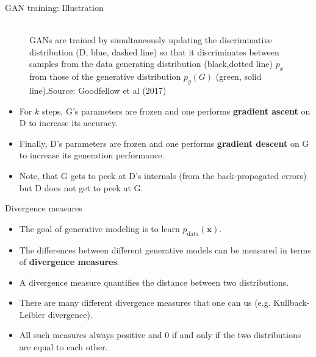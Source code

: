 \begin{frame} {GAN training: Illustration}
\begin{figure}
\centering
{}
\tiny{\\GANs are trained by simultaneously updating the discriminative distribution
(D, blue, dashed line) so that it discriminates between samples from the data generating distribution (black,dotted line) $p_x$ from those of the generative distribution $p_g (G)$ (green, solid line).Source: Goodfellow et al (2017)}
\end{figure}
\begin{itemize}
\item For $k$ steps, G's parameters are frozen and one performs \textbf{gradient ascent} on D to increase its accuracy.
\item Finally, D's parameters are frozen and one performs \textbf{gradient descent} on G to increase its generation performance. %
\item Note, that G gets to peek at D's internals (from the back-propagated errors) but D  does not get to peek at G.
\end{itemize}
\end{frame}

\begin{frame} {Divergence measures}
  \begin{itemize}
    \item The goal of generative modeling is to learn $p_{\text{data}}(\mathbf{x})$.
    \vspace{2mm}
    \item The differences between different generative models can be measured in terms of \textbf{divergence measures}.
    \vspace{2mm}
    \item A divergence measure quantifies the distance between two distributions. %
    \vspace{2mm}
    \item There are many different divergence measures that one can us (e.g. Kullback-Leibler divergence).
    \vspace{2mm}
    \item All such measures always  positive and  0 if and only if the two distributions are equal to each other.
  \end{itemize}
\end{frame}

